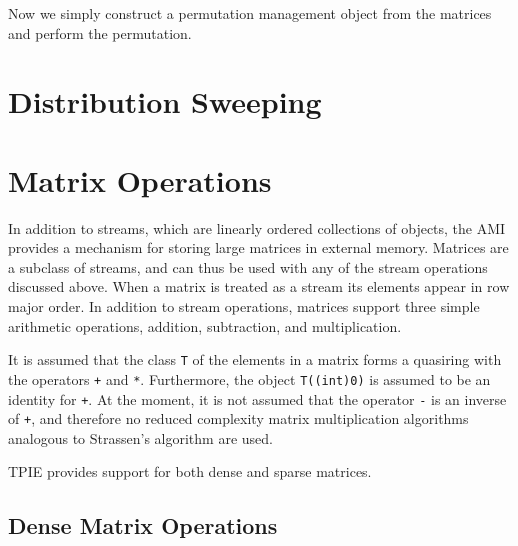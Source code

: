 
 
Now we simply construct a permutation management object from the
matrices and perform the permutation.





\section{Distribution Sweeping} 

\tobewritten


\section{Matrix Operations}


In addition to streams, which
are linearly ordered collections of objects, the AMI provides a
mechanism for storing large matrices in external memory.  Matrices are
a subclass of streams, and can thus be used with any of the stream
operations discussed above.  When a matrix is treated as a stream its
elements appear in row major order.  In addition to stream operations,
matrices support three simple arithmetic operations, addition,
subtraction, and multiplication.

It is assumed that the class \lstinline|T| of the elements in a matrix
forms a quasiring with the operators \lstinline|+| and \lstinline|*|.
Furthermore, the object \lstinline|T((int)0)| is assumed to be an
identity for \lstinline|+|.  At the moment, it is not assumed that the
operator \lstinline|-| is an inverse of \lstinline|+|, and therefore
no reduced complexity matrix multiplication algorithms analogous to
Strassen's algorithm are used.

TPIE provides support for both dense and sparse matrices.


\subsection{Dense Matrix Operations}



